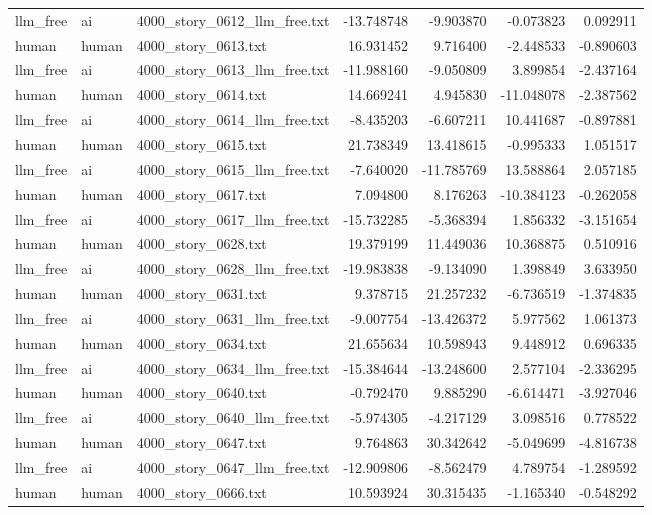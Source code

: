 \begin{longtable}{lllrrrr}
llm\_free & ai & 4000\_story\_0612\_llm\_free.txt & -13.748748 & -9.903870 & -0.073823 & 0.092911 \\
human & human & 4000\_story\_0613.txt & 16.931452 & 9.716400 & -2.448533 & -0.890603 \\
llm\_free & ai & 4000\_story\_0613\_llm\_free.txt & -11.988160 & -9.050809 & 3.899854 & -2.437164 \\
human & human & 4000\_story\_0614.txt & 14.669241 & 4.945830 & -11.048078 & -2.387562 \\
llm\_free & ai & 4000\_story\_0614\_llm\_free.txt & -8.435203 & -6.607211 & 10.441687 & -0.897881 \\
human & human & 4000\_story\_0615.txt & 21.738349 & 13.418615 & -0.995333 & 1.051517 \\
llm\_free & ai & 4000\_story\_0615\_llm\_free.txt & -7.640020 & -11.785769 & 13.588864 & 2.057185 \\
human & human & 4000\_story\_0617.txt & 7.094800 & 8.176263 & -10.384123 & -0.262058 \\
llm\_free & ai & 4000\_story\_0617\_llm\_free.txt & -15.732285 & -5.368394 & 1.856332 & -3.151654 \\
human & human & 4000\_story\_0628.txt & 19.379199 & 11.449036 & 10.368875 & 0.510916 \\
llm\_free & ai & 4000\_story\_0628\_llm\_free.txt & -19.983838 & -9.134090 & 1.398849 & 3.633950 \\
human & human & 4000\_story\_0631.txt & 9.378715 & 21.257232 & -6.736519 & -1.374835 \\
llm\_free & ai & 4000\_story\_0631\_llm\_free.txt & -9.007754 & -13.426372 & 5.977562 & 1.061373 \\
human & human & 4000\_story\_0634.txt & 21.655634 & 10.598943 & 9.448912 & 0.696335 \\
llm\_free & ai & 4000\_story\_0634\_llm\_free.txt & -15.384644 & -13.248600 & 2.577104 & -2.336295 \\
human & human & 4000\_story\_0640.txt & -0.792470 & 9.885290 & -6.614471 & -3.927046 \\
llm\_free & ai & 4000\_story\_0640\_llm\_free.txt & -5.974305 & -4.217129 & 3.098516 & 0.778522 \\
human & human & 4000\_story\_0647.txt & 9.764863 & 30.342642 & -5.049699 & -4.816738 \\
llm\_free & ai & 4000\_story\_0647\_llm\_free.txt & -12.909806 & -8.562479 & 4.789754 & -1.289592 \\
human & human & 4000\_story\_0666.txt & 10.593924 & 30.315435 & -1.165340 & -0.548292 \\

\end{longtable}
